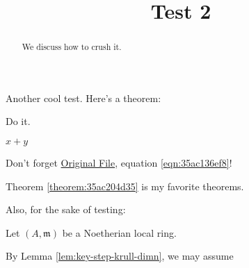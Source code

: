 \documentclass[reqno]{amsart} 
\title{Test 2}
\begin{document}
\maketitle

\begin{abstract}
  We discuss how to crush it.
\end{abstract}


Another cool test.  Here's a theorem:
\begin{theorem}\label{theorem:35ac204d35}
  Do it.
\end{theorem}

$x + y$

Don't forget \href{test.pdf}{Original File}, equation \eqref{eqn:35ac136ef8}!

Theorem \ref{theorem:35ac204d35} is my favorite theorems.

Also, for the sake of testing:
\begin{lemma}\label{lem:key-step-krull-dimn}
  Let $(A,\mathfrak{m})$ be a Noetherian local ring.
\end{lemma}
By Lemma \ref{lem:key-step-krull-dimn}, we may assume 








{} 
\end{document}
